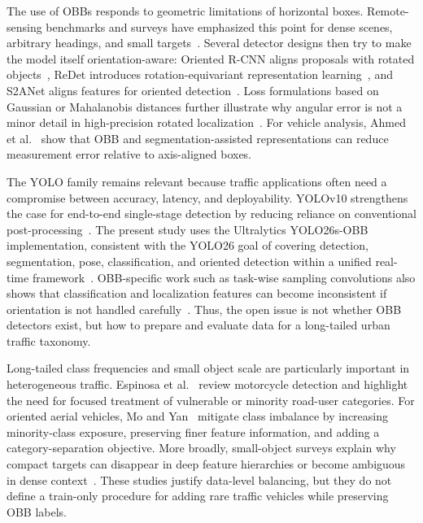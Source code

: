 The use of OBBs responds to geometric limitations of horizontal boxes. Remote-sensing benchmarks and surveys have emphasized this point for dense scenes, arbitrary headings, and small targets~\cite{Ding2022DOTA,Wang2025OBBSurvey,Zand2022OBB}. Several detector designs then try to make the model itself orientation-aware: Oriented R-CNN aligns proposals with rotated objects~\cite{Xie2021OrientedRCNN}, ReDet introduces rotation-equivariant representation learning~\cite{Han2021ReDet}, and S2ANet aligns features for oriented detection~\cite{Han2022S2ANet}. Loss formulations based on Gaussian or Mahalanobis distances further illustrate why angular error is not a minor detail in high-precision rotated localization~\cite{Yang2021KLD,Wen2022MahalanobisRotatedDetection}. For vehicle analysis, Ahmed et al.~\cite{Ahmed2025} show that OBB and segmentation-assisted representations can reduce measurement error relative to axis-aligned boxes.

The YOLO family remains relevant because traffic applications often need a compromise between accuracy, latency, and deployability. YOLOv10 strengthens the case for end-to-end single-stage detection by reducing reliance on conventional post-processing~\cite{Wang2024YOLOv10}. The present study uses the Ultralytics YOLO26s-OBB implementation, consistent with the YOLO26 goal of covering detection, segmentation, pose, classification, and oriented detection within a unified real-time framework~\cite{Jocher2026}. OBB-specific work such as task-wise sampling convolutions also shows that classification and localization features can become inconsistent if orientation is not handled carefully~\cite{Huang2025TSConv}. Thus, the open issue is not whether OBB detectors exist, but how to prepare and evaluate data for a long-tailed urban traffic taxonomy.

Long-tailed class frequencies and small object scale are particularly important in heterogeneous traffic. Espinosa et al.~\cite{Espinosa2020} review motorcycle detection and highlight the need for focused treatment of vulnerable or minority road-user categories. For oriented aerial vehicles, Mo and Yan~\cite{Mo2020} mitigate class imbalance by increasing minority-class exposure, preserving finer feature information, and adding a category-separation objective. More broadly, small-object surveys explain why compact targets can disappear in deep feature hierarchies or become ambiguous in dense context~\cite{Cheng2023SmallObjectSurvey,Nikouei2025SmallObjectSurvey}. These studies justify data-level balancing, but they do not define a train-only procedure for adding rare traffic vehicles while preserving OBB labels.


